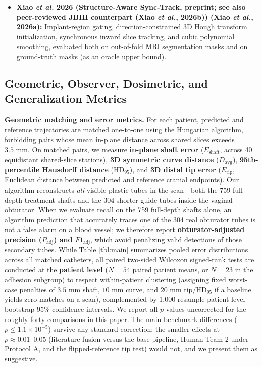 \documentclass[
  11pt,
]{article}
\begin{document}
\begin{itemize}
  and voxel-wise epistemic uncertainty \(\sigma_p\); candidate tracks
  are extracted on the uncertainty-penalized map, filtered by ensemble
  disagreement (\(\bar{\sigma}_p/\bar{p}\)), and smoothed via
  inverse-variance-weighted cubic polynomial regression.
\item
  \textbf{Xiao \emph{et al.} 2026 (Structure-Aware Sync-Track, preprint;
  see also peer-reviewed JBHI counterpart (Xiao \emph{et al.}, 2026b))
  (Xiao \emph{et al.}, 2026a):} Implant-region gating,
  direction-constrained 3D Hough transform initialization, synchronous
  inward slice tracking, and cubic polynomial smoothing, evaluated both
  on out-of-fold MRI segmentation masks and on ground-truth masks (as an
  oracle upper bound).
\end{itemize}

\subsection{Geometric, Observer, Dosimetric, and Generalization
Metrics}\label{geometric-observer-dosimetric-and-generalization-metrics}

\textbf{Geometric matching and error metrics.} For each patient,
predicted and reference trajectories are matched one-to-one using the
Hungarian algorithm, forbidding pairs whose mean in-plane distance
across shared slices exceeds \(3.5\text{ mm}\). On matched pairs, we
measure \textbf{in-plane shaft error} (\(E_{\text{shaft}}\), across 40
equidistant shared-slice stations), \textbf{3D symmetric curve distance}
(\(D_{\text{avg}}\)), \textbf{95th-percentile Hausdorff distance}
(\(\text{HD}_{95}\)), and \textbf{3D distal tip error}
(\(E_{\text{tip}}\), Euclidean distance between predicted and reference
cranial endpoints). Our algorithm reconstructs \emph{all} visible
plastic tubes in the scan---both the 759 full-depth treatment shafts and
the 304 shorter guide tubes inside the vaginal obturator. When we
evaluate recall on the 759 full-depth shafts alone, an algorithm
prediction that accurately traces one of the 304 real obturator tubes is
not a false alarm on a blood vessel; we therefore report
\textbf{obturator-adjusted precision (\(P_{\text{adj}}\)) and
\(F1_{\text{adj}}\)}, which avoid penalizing valid detections of those
secondary tubes. While Table \ref{tbl:main} summarizes pooled error
distributions across all matched catheters, all paired two-sided
Wilcoxon signed-rank tests are conducted at the \textbf{patient level}
(\(N = 54\) paired patient means, or \(N = 23\) in the adhesion
subgroup) to respect within-patient clustering (assigning fixed
worst-case penalties of \(3.5\text{ mm}\) shaft, \(10\text{ mm}\) curve,
and \(20\text{ mm}\) tip/\(\text{HD}_{95}\) if a baseline yields zero
matches on a scan), complemented by 1,000-resample patient-level
bootstrap 95\% confidence intervals. We report all \(p\)-values
uncorrected for the roughly forty comparisons in this paper. The main
benchmark differences (\(p \le 1.1 \times 10^{-5}\)) survive any
standard correction; the smaller effects at
\(p \approx 0.01\text{--}0.05\) (literature fusion versus the base
pipeline, Human Team 2 under Protocol A, and the flipped-reference tip
test) would not, and we present them as suggestive.
\end{document}
